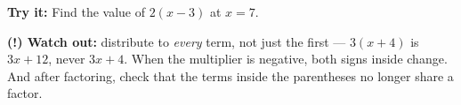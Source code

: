 \documentclass[12pt]{article}
\begin{document}
\begin{tryitbox}
\textbf{Try it:} Find the value of $2(x-3)$ at $x = 7$.\\[2pt]
\end{tryitbox}

\begin{watchoutbox}
\textbf{(!) Watch out:} distribute to \emph{every} term, not just the first ---
$3(x+4)$ is $3x+12$, never $3x+4$. When the multiplier is negative, both signs
inside change. And after factoring, check that the terms inside the parentheses
no longer share a factor.
\end{watchoutbox}
\end{document}
